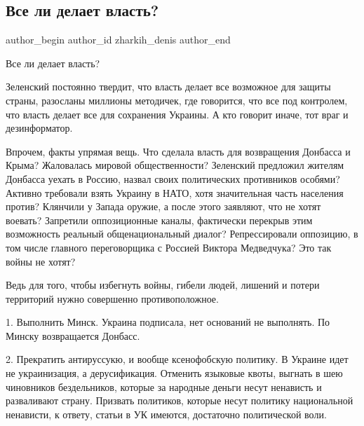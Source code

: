  
 
 
 
 
 
\subsection{Все ли делает власть?}
\label{sec:26_01_2022.fb.zharkih_denis.1.vse_li_delaet_vlast}
 
\ifcmt
 author_begin
   author_id zharkih_denis
 author_end
\fi

Все ли делает власть?

Зеленский постоянно твердит, что власть делает все возможное для защиты страны,
разосланы миллионы методичек, где говорится, что все под контролем, что власть
делает все для сохранения Украины. А кто говорит иначе, тот враг и
дезинформатор.

Впрочем, факты упрямая вещь. Что сделала власть для возвращения Донбасса и
Крыма? Жаловалась мировой общественности? Зеленский предложил жителям Донбасса
уехать в Россию, назвал своих политических противников особями? Активно
требовали взять Украину в НАТО, хотя значительная часть населения против?
Клянчили у Запада оружие, а после этого заявляют, что не хотят воевать?
Запретили оппозиционные каналы, фактически перекрыв этим возможность реальный
общенациональный диалог? Репрессировали оппозицию, в том числе главного
переговорщика с Россией Виктора Медведчука? Это так войны не хотят? 

Ведь для того, чтобы избегнуть войны, гибели людей, лишений и потери территорий
нужно совершенно противоположное. 

1. Выполнить Минск. Украина подписала, нет оснований не выполнять. По Минску
возвращается Донбасс. 

2. Прекратить антируссукю, и вообще ксенофобскую политику. В Украине идет не
украинизация, а дерусификация. Отменить языковые квоты, выгнать в шею
чиновников бездельников, которые за народные деньги несут ненависть и
разваливают страну. Призвать политиков, которые несут политику национальной
ненависти, к ответу, статьи в УК имеются, достаточно политической воли. 

